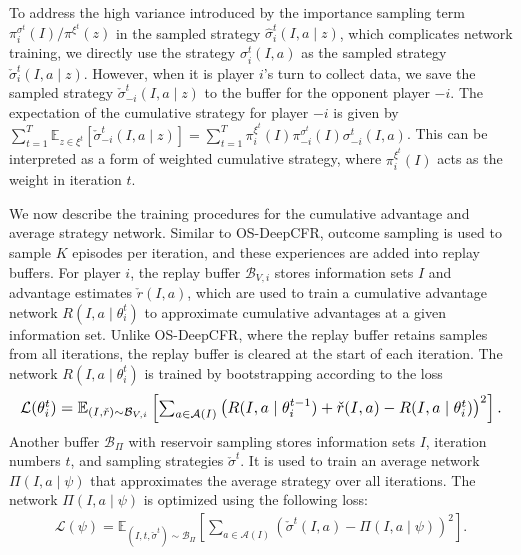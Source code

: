 \documentclass[letterpaper]{article} %
\makeatletter
\renewenvironment{align*}{%
  \linenomath 
  \start@align\@ne\st@rredtrue\m@ne
}{%
  \endalign
  \endlinenomath 
}
\makeatother
\begin{document}
To address the high variance introduced by the importance sampling term 
$\pi^{\sigma^t}_{i}(I) / \pi^{\xi^t}(z) $ in the sampled strategy $\hat{\sigma}_i^t(I, a \mid z)$, which complicates network training, we directly use the strategy $\sigma_i^t(I, a)$ as the sampled strategy $\check{\sigma}_i^t(I, a \mid z)$. 
However, when it is player $i$'s turn to collect data, we save the sampled strategy $\check{\sigma}_{-i}^t(I, a \mid z)$ to the buffer for the opponent player $-i$. The expectation of the cumulative strategy for player $-i$ is given by $\sum_{t=1}^{T}\mathbb{E}_{z \in \xi^t}\left[\check{\sigma}_{-i}^t(I, a\mid z)  \right] = \sum_{t=1}^{T}\pi_i^{\xi^t}(I)\pi_{-i}^{\sigma^t}(I)\sigma_{-i}^t(I, a)$. This can be interpreted as a form of weighted cumulative strategy, where $\pi_{i}^{\xi^t}(I)$ acts as the weight in iteration $t$.

We now describe the training procedures for the cumulative advantage and average strategy network.
Similar to OS-DeepCFR, outcome sampling is used to sample $K$ episodes per iteration, and these experiences are added into replay buffers.
For player $i$, the replay buffer $\mathcal{B}_{V, i}$ stores information sets $I$ and advantage estimates $\check{r}(I, a)$, which are used to train a cumulative advantage network $R(I, a \mid \theta_i^t)$ to approximate cumulative advantages at a given information set. 
Unlike OS-DeepCFR, where the replay buffer retains samples from all iterations, the replay buffer is cleared at the start of each iteration. 
The network $R(I, a \mid \theta_i^t)$ is trained by bootstrapping according to the loss 
\begin{align*}
    \resizebox{1\linewidth}{!}{$
\mathcal{L}(\theta^t_i) = \mathbb{E}_{(I, \check{r} )\sim \mathcal{B}_{V, i}}\left[\sum_{a \in \mathcal{A}(I)}^{}\left(R(I, a \mid \theta^{t-1}_{i} )+\check{r}(I, a)-R(I, a\mid\theta_i^t)\right)^2\right].
$}
\end{align*}
Another buffer $\mathcal{B}_\Pi$ with reservoir sampling stores information sets $I$, iteration numbers $t$, and sampling strategies $\check{\sigma}^t$. It is used to train an average network $\Pi(I, a \mid \psi)$ that approximates the average strategy over all iterations. 
The network $\Pi(I, a\mid \psi)$ is optimized using the following loss:
\begin{align*}
    \mathcal{L}(\psi) = \mathbb{E}_{(I, t, \check{\sigma}^{t})\sim \mathcal{B}_{\Pi}}\left[\sum_{a\in \mathcal{A}(I)}\left(\check{\sigma}^{t}(I, a) - \Pi(I, a \mid \psi)\right)^2\right].
\end{align*}
\end{document}
